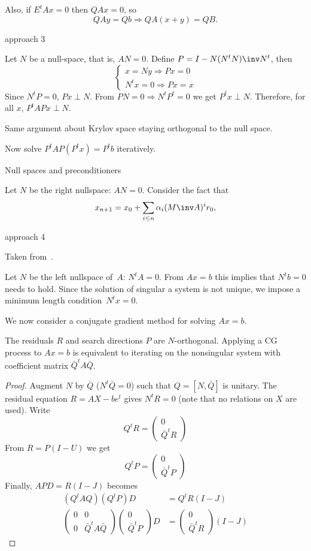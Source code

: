 Also, if $E^tAx=0$ then $QAx=0$, so
\[ QAy=Qb\Rightarrow QA(x+y) = QB. \]

 {approach 3}

Let $N$ be a null-space, that is, $AN=0$. Define $P=I-N(N^tN)\inv N^t$, then
\[\begin{cases}x=Ny\Rightarrow Px=0\\ N^tx=0\Rightarrow Px=x\end{cases}\]
Since $N^tP=0$, $Px\perp N$. From $PN=0\Rightarrow N^tP^t=0$ we get
$P^tx\perp N$. Therefore, for all $x$, $P^tAPx\perp N$.

Same argument about Krylov space staying orthogonal to the null space.

Now solve $P^tAP(P^tx)=P^tb$ iteratively.

 {Null spaces and preconditioners}

Let $N$ be the right nullspace: $AN=0$. Consider the fact that
\[ x_{n+1}=x_0 + \sum_{i\leq n}\alpha_i(M\inv A)^ir_0,\]

 {approach 4}

Taken from~\cite{LewisRehm:nonseparable}.

Let $N$ be the left nullspace of~$A$: $N^tA=0$. From $Ax=b$ this
implies that $N^tb=0$ needs to hold. Since the solution of singular
a system is not unique, we impose a minimum length condition~$N^tx=0$.

We now consider a conjugate gradient method for solving $Ax=b$.
\begin{lemma}
  The residuals $R$ and search directions $P$ are
  $N$-orthogonal. Applying a CG process to $Ax=b$ is equivalent to
  iterating on the nonsingular system with coefficient matrix $\bar
  Q^tA\bar Q$.
\end{lemma}
\begin{proof}
Augment $N$ by $\bar Q$
($N^t\bar Q=0$) such that $Q=[N,\bar Q]$ is unitary. The residual
equation $R=AX-be^t$ gives $N^tR=0$ (note that no relations on $X$ are
used). Write 
\[ Q^tR=
\begin{pmatrix}
  0\\ \bar Q^tR
\end{pmatrix}
\]
From $R=P(I-U)$ we get
\[ Q^tP=
\begin{pmatrix}
  0\\ \bar Q^tP
\end{pmatrix}
\]
Finally, $APD=R(I-J)$ becomes
\[
\begin{array}{rl}
  (Q^tAQ)(Q^tP)D&{}=Q^tR(I-J)\\
  \begin{pmatrix}
    0&0\\ 0&\bar Q^tA\bar Q
  \end{pmatrix}
  \begin{pmatrix}
    0\\ \bar Q^tP
  \end{pmatrix} D&{}=
  \begin{pmatrix}
    0\\ \bar Q^tR
  \end{pmatrix}(I-J)
\end{array}
\]
\end{proof}
